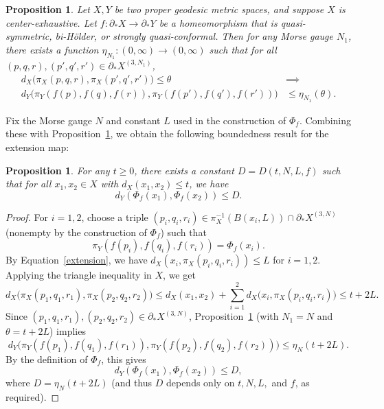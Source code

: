 \documentclass[a4paper,11pt,oneside]{article}
\newtheorem{Proposition}[Theorem]{Proposition}
\begin{document}
\begin{Proposition}\label{key}
    Let $X, Y$ be two proper geodesic metric spaces, and suppose $X$ is center-exhaustive. Let $f:\partial_*X\to \partial_*Y$ be a homeomorphism that is quasi-symmetric, bi-H\"older, or strongly quasi-conformal. Then for any Morse gauge $N_1$, there exists a function $\eta_{N_1}:(0, \infty)\to(0, \infty)$ such that for all $(p, q, r), (p',q',r')\in \partial_*X^{(3, N_1)}$, 
    \[
    \begin{aligned}
   d_X\!\bigl(\pi_X(p, q, r), \pi_X(p', q',r')\bigr) \le \theta &\implies \\
d_Y\!\bigl(\pi_Y(f(p), f(q), f(r)), \pi_Y(f(p'),f(q'),f(r'))\bigr) &\le \eta_{N_1}(\theta).
    \end{aligned}
    \]

\end{Proposition}

Fix the Morse gauge $N$ and constant $L$ used in the construction of $\Phi_f$. Combining these with Proposition~\ref{key}, we obtain the following boundedness result for the extension map:

\begin{Proposition}\label{extenbound}
   For any $t\ge0$, there exists a constant $D=D(t, N, L, f)$ such that for all $x_1, x_2\in X$ with $d_X(x_1, x_2)\le t$, we have
    \[
    d_Y(\Phi_f(x_1), \Phi_f(x_2))\le D.
    \]
\end{Proposition}

\begin{proof}
    For $i=1,2$, choose a triple $(p_i, q_i, r_i)\in\pi_X^{-1}(B(x_i, L))\cap \partial_*X^{(3, N)}$ (nonempty by the construction of $\Phi_f$) such that 
    \[
    \pi_Y(f(p_i), f(q_i),f(r_i))=\Phi_f(x_i).
    \]
    By Equation~\eqref{extension}, we have $d_X(x_i, \pi_X(p_i,q_i,r_i))\le L$ for $i=1,2$. Applying the triangle inequality in $X$, we get
    \[
d_X\!\bigl(\pi_X(p_1, q_1, r_1), \pi_X(p_2,q_2, r_2)\bigr) \le d_X(x_1,x_2) + \sum_{i=1}^2 d_X\!\bigl(x_i,\pi_X(p_i,q_i,r_i)\bigr) \le t+2L.
    \]
    Since $(p_1,q_1,r_1), (p_2,q_2,r_2)\in\partial_*X^{(3, N)}$, Proposition~\ref{key} (with $N_1=N$ and $\theta=t+2L$) implies
    \[
d_Y\!\bigl(\pi_Y(f(p_1),f(q_1),f(r_1)), \pi_Y(f(p_2),f(q_2),f(r_2))\bigr) \le \eta_N(t+2L).
    \]
    By the definition of $\Phi_f$, this gives
    \[
    d_Y(\Phi_f(x_1), \Phi_f(x_2))\le D,
    \]
    where $D=\eta_N(t+2L)$ (and thus $D$ depends only on $t, N, L,$ and $f$, as required).
\end{proof}
\end{document}
